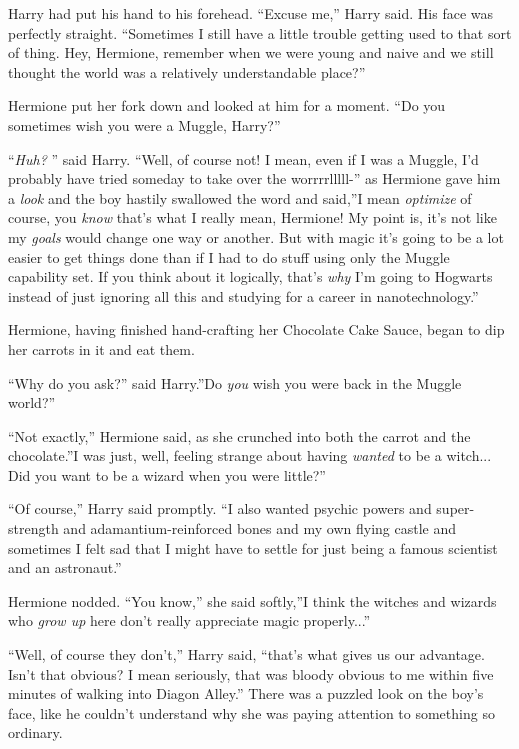 Harry had put his hand to his forehead. ``Excuse me,'' Harry said. His
face was perfectly straight. ``Sometimes I still have a little trouble
getting used to that sort of thing. Hey, Hermione, remember when we were
young and naive and we still thought the world was a relatively
understandable place?''

Hermione put her fork down and looked at him for a moment. ``Do you
sometimes wish you were a Muggle, Harry?''

``\emph{Huh?} '' said Harry. ``Well, of course not! I mean, even if I was
a Muggle, I'd probably have tried someday to take over the
worrrrlllll-'' as Hermione gave him a \emph{look} and the boy hastily
swallowed the word and said,''I mean \emph{optimize} of course, you
\emph{know} that's what I really mean, Hermione! My point is, it's not
like my \emph{goals} would change one way or another. But with magic
it's going to be a lot easier to get things done than if I had to do
stuff using only the Muggle capability set. If you think about it
logically, that's \emph{why} I'm going to Hogwarts instead of just
ignoring all this and studying for a career in nanotechnology.''

Hermione, having finished hand-crafting her Chocolate Cake Sauce, began
to dip her carrots in it and eat them.

``Why do you ask?'' said Harry.''Do \emph{you} wish you were back in the
Muggle world?''

``Not exactly,'' Hermione said, as she crunched into both the carrot and
the chocolate.''I was just, well, feeling strange about having
\emph{wanted} to be a witch... Did you want to be a wizard when you
were little?''

``Of course,'' Harry said promptly. ``I also wanted psychic powers and
super-strength and adamantium-reinforced bones and my own flying castle
and sometimes I felt sad that I might have to settle for just being a
famous scientist and an astronaut.''

Hermione nodded. ``You know,'' she said softly,''I think the witches and
wizards who \emph{grow up} here don't really appreciate magic
properly...''

``Well, of course they don't,'' Harry said, ``that's what gives us our
advantage. Isn't that obvious? I mean seriously, that was bloody obvious
to me within five minutes of walking into Diagon Alley.'' There was a
puzzled look on the boy's face, like he couldn't understand why she was
paying attention to something so ordinary.
